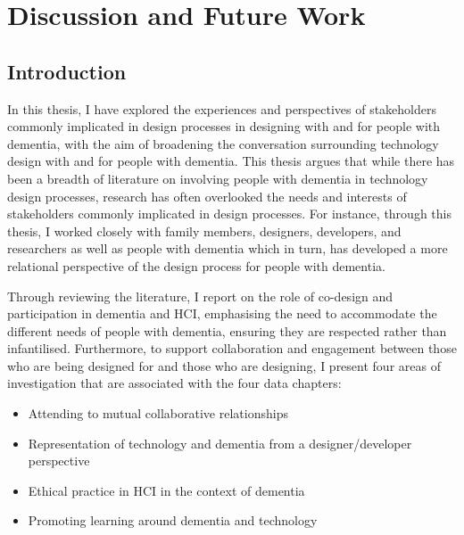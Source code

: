 \chapter{Discussion and Future Work}
\label{Discussion}

\section{Introduction}
\label{Discussion:Intro}

In this thesis, I have explored the experiences and perspectives of stakeholders commonly implicated in design processes in designing with and for people with dementia, with the aim of broadening the conversation surrounding technology design with and for people with dementia. This thesis argues that while there has been a breadth of literature on involving people with dementia in technology design processes, research has often overlooked the needs and interests of stakeholders commonly implicated in design processes. For instance, through this thesis, I worked closely with family members, designers, developers, and researchers as well as people with dementia which in turn, has developed a more relational perspective of the design process for people with dementia.

Through reviewing the literature, I report on the role of co-design and participation in dementia and HCI, emphasising the need to accommodate the different needs of people with dementia, ensuring they are respected rather than infantilised. Furthermore, to support collaboration and engagement between those who are being designed for and those who are designing, I present four areas of investigation that are associated with the four data chapters: 
\begin{itemize}
    \item Attending to mutual collaborative relationships
    \item Representation of technology and dementia from a designer/developer perspective
    \item Ethical practice in HCI in the context of dementia
    \item Promoting learning around dementia and technology
\end{itemize}

